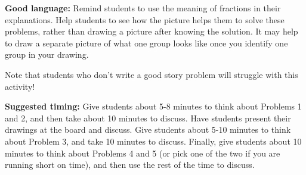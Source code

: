 \documentclass[nooutcomes,noauthor, handout]{ximera}
\begin{document}
\begin{instructorNotes}
{\bf Good language:}  Remind students to use the meaning of fractions in their explanations. Help students to see how the picture helps them to solve these problems, rather than drawing a picture after knowing the solution. It may help to draw a separate picture of what one group looks like once you identify one group in your drawing.

Note that students who don't write a good story problem will struggle with this activity!

{\bf Suggested timing:} Give students about 5-8 minutes to think about Problems 1 and 2, and then take about 10 minutes to discuss. Have students present their drawings at the board and discuss. Give students about 5-10 minutes to think about Problem 3, and take 10 minutes to discuss. Finally, give students about 10 minutes to think about Problems 4 and 5 (or pick one of the two if you are running short on time), and then use the rest of the time to discuss.

\end{instructorNotes}
\end{document}
